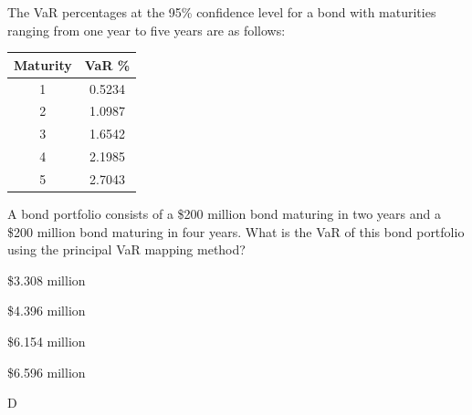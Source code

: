 \documentclass{article}
\newcounter{question} %
\begin{document}
\begin{question}
    The VaR percentages at the 95\% confidence level for a bond with maturities ranging from one year to five years are as follows:
    \begin{table}[H]
        \centering
        \begin{tabular}{|c|c|}
            \hline
            Maturity & VaR \% \\
            \hline
            1 & 0.5234 \\
            2 & 1.0987 \\
            3 & 1.6542 \\
            4 & 2.1985 \\
            5 & 2.7043 \\
            \hline
        \end{tabular}
    \end{table}

    A bond portfolio consists of a \$200 million bond maturing in two years and a \$200 million bond maturing in four years. What is the VaR of this bond portfolio using the principal VaR mapping method?
\end{question}

\begin{choices}
    \item \$3.308 million
    \item \$4.396 million
    \item \$6.154 million
    \item \$6.596 million
\end{choices}

\begin{correctanswer}
    D
\end{correctanswer}
\end{document}
